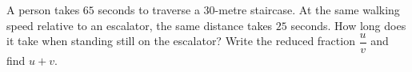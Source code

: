 A person takes $65$ seconds to traverse a $30$-metre staircase. At the same walking speed relative to an escalator, the same distance takes $25$ seconds. How long does it take when standing still on the escalator? Write the reduced fraction $\dfrac{u}{v}$ and find $u+v$.
